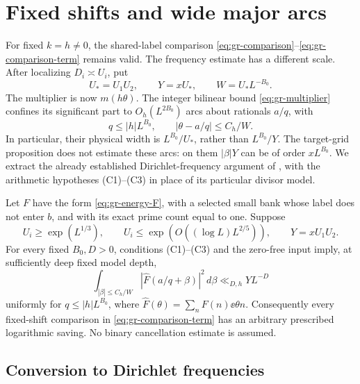 \section{Fixed shifts and wide major arcs}\label{sec:fixed-shift-comparison}

For fixed \(k=h\ne0\), the shared-label comparison
\eqref{eq:gr-comparison}--\eqref{eq:gr-comparison-term} remains valid.
The frequency estimate has a different scale. After localizing
\(D_i\asymp U_i\), put
\[
 U_*=U_1U_2,\qquad Y=xU_*,\qquad W=U_*L^{-B_0}.
\]
The multiplier is now \(m(h\theta)\). The integer bilinear bound
\eqref{eq:gr-multiplier} confines its significant part to
\(O_h(L^{2B_0})\) arcs about rationals \(a/q\), with
\[
 q\le |h|L^{B_0},\qquad
       |\theta-a/q|\le C_h/W.
\]
In particular, their physical width is \(L^{B_0}/U_*\), rather than
\(L^{B_0}/Y\). The target-grid proposition does not estimate these
arcs: on them \(|\beta|Y\) can be of order \(xL^{B_0}\).
We extract the already established Dirichlet-frequency argument of
\cite[Sections 6.2--6.4]{walsh}, with the arithmetic hypotheses
\textup{(C1)--(C3)} in place of its particular divisor model.

\begin{proposition}
\label{prop:fixed-comparison-energy}
Let \(F\) have the form \eqref{eq:gr-energy-F}, with a selected
small bank whose label does not enter \(b\), and with its exact
prime count equal to one. Suppose
\[
 U_i\ge\exp(L^{1/3}),\qquad
 U_i\le\exp(O((\log L)L^{2/5})),\qquad Y=xU_1U_2.
\]
For every fixed \(B_0,D>0\), conditions \textup{(C1)--(C3)} and
the zero-free input imply, at sufficiently deep fixed model depth,
\begin{equation}\label{eq:fixed-wide-energy}
 \int_{|\beta|\le C_h/W}
      |\widehat F(a/q+\beta)|^2\,d\beta
                            \ll_{D,h}YL^{-D}
\end{equation}
uniformly for \(q\le |h|L^{B_0}\), where
\(\widehat F(\theta)=\sum_nF(n)\ee{\theta n}\).
Consequently every fixed-shift comparison in
\eqref{eq:gr-comparison-term} has an arbitrary prescribed
logarithmic saving. No binary cancellation estimate is assumed.
\end{proposition}

\subsection{Conversion to Dirichlet frequencies}

